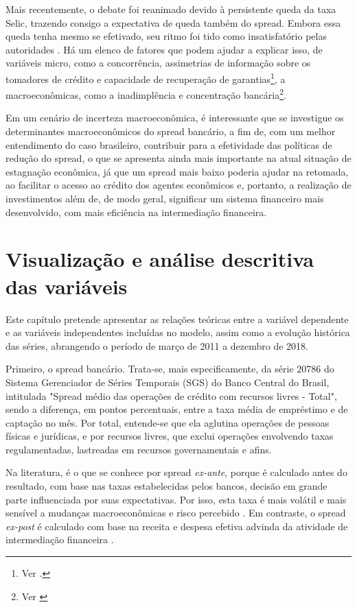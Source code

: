 \documentclass[a4paper, article, 12pt, openany, oneside, english, brazil]{abntex2}
\numberwithin{equation}{section}
\begin{document}
    Mais recentemente, o debate foi reanimado devido à persistente queda da taxa Selic, trazendo consigo a expectativa de queda também do spread. Embora essa queda tenha mesmo se efetivado, seu ritmo foi tido como insatisfatório pelas autoridades \cite{valor1}. Há um elenco de fatores que podem ajudar a explicar isso, de variáveis micro, como a concorrência, assimetrias de informação sobre os tomadores de crédito e capacidade de recuperação de garantias\footnote{Ver \cite[p.~13]{reb2018}.}, a macroeconômicas, como a inadimplência e concentração bancária\footnote{Ver \cite{valor2}}.
    
    Em um cenário de incerteza macroeconômica, é interessante que se investigue os determinantes macroeconômicos do spread bancário, a fim de, com um melhor entendimento do caso brasileiro, contribuir para a efetividade das políticas de redução do spread, o que se apresenta ainda mais importante na atual situação de estagnação econômica, já que um spread mais baixo poderia ajudar na retomada, ao facilitar o acesso ao crédito dos agentes econômicos e, portanto, a realização de investimentos \cite[p.~8]{manhica12} além de, de modo geral, significar um sistema financeiro mais desenvolvido, com mais eficiência na intermediação financeira.

\section{Visualização e análise descritiva das variáveis}

    Este capítulo pretende apresentar as relações teóricas entre a variável dependente e as variáveis independentes incluídas no modelo, assim como a evolução histórica das séries, abrangendo o período de março de 2011 a dezembro de 2018.

    Primeiro, o spread bancário. Trata-se, mais especificamente, da série 20786 do Sistema Gerenciador de Séries Temporais (SGS) do Banco Central do Brasil, intitulada "Spread médio das operações de crédito com recursos livres - Total", sendo a diferença, em pontos percentuais, entre a taxa média de empréstimo e de captação no mês. Por total, entende-se que ela aglutina operações de pessoas físicas e jurídicas, e por recursos livres, que exclui operações envolvendo taxas regulamentadas, lastreadas em recursos governamentais e afins.

    Na literatura, é o que se conhece por spread \textit{ex-ante}, porque é calculado antes do resultado, com base nas taxas estabelecidas pelos bancos, decisão em grande parte influenciada por suas expectativas. Por isso, esta taxa é mais volátil e mais sensível a mudanças macroeconômicas e risco percebido \cite[p.~226]{leal07}. Em contraste, o spread \textit{ex-post} é calculado com base na receita e despesa efetiva advinda da atividade de intermediação financeira \cite[p.~2]{almeida15}. 
    
\end{document}
